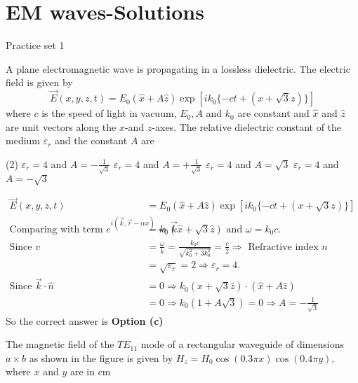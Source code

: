 \chapter{EM waves-Solutions}
\begin{abox}
	Practice set 1
\end{abox}
\begin{enumerate}
	\begin{minipage}{\textwidth}
		\item A plane electromagnetic wave is propagating in a lossless dielectric. The electric field is given by
		$$
		\vec{E}(x, y, z, t)=E_{0}(\hat{x}+A \hat{z}) \exp \left[i k_{0}\{-c t+(x+\sqrt{3} z)\}\right]
		$$
		where $c$ is the speed of light in vacuum, $E_{0}, A$ and $k_{0}$ are constant and $\hat{x}$ and $\hat{z}$ are unit vectors along the $x$-and $z$-axes. The relative dielectric constant of the medium $\varepsilon_{r}$ and the constant $A$ are
	\end{minipage}
	\begin{tasks}(2)
		\task[\textbf{a.}]$\varepsilon_{r}=4$ and $A=-\frac{1}{\sqrt{3}}$
		\task[\textbf{b.}]$\varepsilon_{r}=4$ and $A=+\frac{1}{\sqrt{3}}$
		\task[\textbf{c.}]$\varepsilon_{r}=4$ and $A=\sqrt{3}$
		\task[\textbf{d.}]$\varepsilon_{r}=4$ and $A=-\sqrt{3}$
	\end{tasks}
\begin{answer}
	\begin{align*}
	\vec{E}(x, y, z, t)&=E_{0}(\hat{x}+A \hat{z}) \exp \left[i k_{0}\{-c t+(x+\sqrt{3} z)\}\right]\\
	\text{Comparing with term }e^{i(\vec{k}, \vec{r}-\alpha x)} \Rightarrow \vec{k}&=k_{0}(\hat{x}+\sqrt{3} \hat{z})\text{ and }\omega=k_{0} c.\\
	\text{Since }v&=\frac{\omega}{k}=\frac{k_{0} c}{\sqrt{k_{0}^{2}+3 k_{0}^{2}}}=\frac{c}{2} \Rightarrow\text{ Refractive index }n\\&=\sqrt{\varepsilon_{r}}=2 \Rightarrow \varepsilon_{r}=4.\\
	\text{Since }\vec{k} \cdot \hat{n}&=0 \Rightarrow k_{0}(\hat{x}+\sqrt{3} \hat{z}) \cdot(\hat{x}+A \hat{z})\\&=0 \Rightarrow k_{0}(1+A \sqrt{3})=0 \Rightarrow A=-\frac{1}{\sqrt{3}}
	\end{align*}
	So the correct answer is \textbf{Option (c)}
\end{answer}
	\begin{minipage}{\textwidth}
		\item The magnetic field of the $T E_{11}$ mode of a rectangular waveguide of dimensions $a \times b$ as shown in the figure is given by $H_{z}=H_{0} \cos (0.3 \pi x) \cos (0.4 \pi y)$, where $x$ and $y$ are in cm

\end{minipage}
\end{enumerate}
